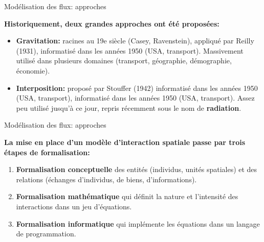 \begin{frame}{Modélisation des flux: approches}

\textbf{Historiquement, deux grandes approches ont été proposées:}

\begin{itemize}
  \item \textbf{Gravitation:} racines au 19e siècle (Casey, Ravenstein), appliqué par Reilly (1931), informatisé dans les années 1950 (USA, transport). Massivement utilisé dans plusieurs domaines (transport, géographie, démographie, économie).
  \item \textbf{Interposition:} proposé par Stouffer (1942) informatisé dans les années 1950 (USA, transport), informatisé dans les années 1950 (USA, transport). Assez peu utilisé jusqu'à ce jour, repris récemment sous le nom de \textbf{radiation}.
\end{itemize}

\end{frame}


\begin{frame}{Modélisation des flux: approches}

\textbf{La mise en place d'un modèle d'interaction spatiale passe par trois étapes de formalisation:}

\begin{enumerate}
  \item \textbf{Formalisation conceptuelle} des entités (individus, unités spatiales) et des relations (échanges d'individus, de biens, d'informations).
  \item \textbf{Formalisation mathématique} qui définit la nature et l'intensité des interactions dans un jeu d'équations.
  \item \textbf{Formalisation informatique} qui implémente les équations dans un langage de programmation.
\end{enumerate}



\end{frame}



